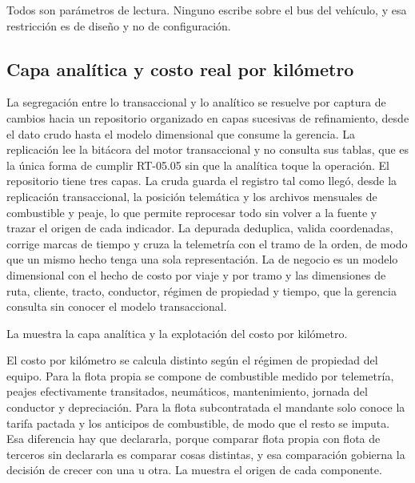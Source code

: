 Todos son parámetros de lectura. Ninguno escribe sobre el bus del vehículo, y esa restricción es de
diseño y no de configuración.

\subsection{Capa analítica y costo real por kilómetro}\label{sec:4-analitica}

La segregación entre lo transaccional y lo analítico se resuelve por captura de cambios hacia un
repositorio organizado en capas sucesivas de refinamiento, desde el dato crudo hasta el modelo
dimensional que consume la gerencia. La replicación lee la bitácora del motor transaccional y no
consulta sus tablas, que es la única forma de cumplir RT-05.05 sin que la analítica toque la operación.
El repositorio tiene tres capas. La cruda guarda el registro tal como
llegó, desde la replicación transaccional, la posición telemática y los archivos mensuales de
combustible y peaje, lo que permite reprocesar todo sin volver a la fuente y trazar el origen de cada
indicador. La depurada deduplica, valida coordenadas, corrige marcas de tiempo y cruza la telemetría con
el tramo de la orden, de modo que un mismo hecho tenga una sola representación. La de negocio es un
modelo dimensional con el hecho de costo por viaje y por tramo y las dimensiones de ruta, cliente,
tracto, conductor, régimen de propiedad y tiempo, que la gerencia consulta sin conocer el modelo
transaccional.

La  muestra la capa analítica y la explotación del costo por kilómetro.


El costo por kilómetro se calcula distinto según el régimen de propiedad del equipo. Para la flota
propia se compone de combustible medido por telemetría, peajes efectivamente transitados, neumáticos,
mantenimiento, jornada del conductor y depreciación. Para la flota subcontratada el mandante solo
conoce la tarifa pactada y los anticipos de combustible, de modo que el resto se imputa. Esa diferencia
hay que declararla, porque comparar flota propia con flota de terceros sin declararla es comparar cosas
distintas, y esa comparación gobierna la decisión de crecer con una u otra. La 
muestra el origen de cada componente.

